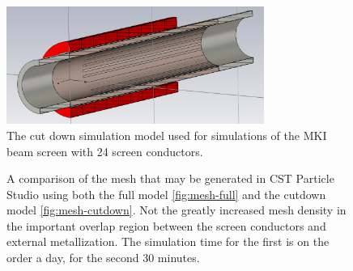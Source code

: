 \begin{figure}
\begin{center}
\includegraphics[width=0.75\textwidth]{LHC_MKI/figures/cutDownModel.png}
\end{center}
\caption{The cut down simulation model used for simulations of the MKI beam screen with 24 screen conductors.}
\label{fig:cut-down-mki-cap-end}
\end{figure}

\begin{figure}
\caption{A comparison of the mesh that may be generated in CST Particle Studio using both the full model \ref{fig:mesh-full} and the cutdown model \ref{fig:mesh-cutdown}. Not the greatly increased mesh density in the important overlap region between the screen conductors and external metallization. The simulation time for the first is on the order a day, for the second 30 minutes.}
\label{fig:mki-mesh-com-cst}
\end{figure}

